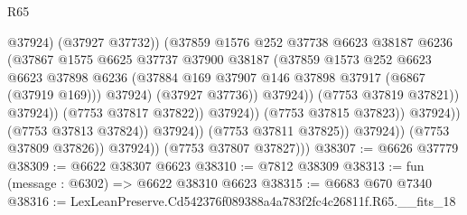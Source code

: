 \begin{lexlean}{R65}
\begin{coremodule}
{                                                  @37924)
                                                (@37927 @37732))
                                              (@37859
                                                @1576
                                                @252
                                                @37738
                                                @6623
                                                @38187
                                                @6236
                                                (@37867
                                                  @1575
                                                  @6625
                                                  @37737
                                                  @37900
                                                  @38187
                                                  (@37859
                                                    @1573
                                                    @252
                                                    @6623
                                                    @6623
                                                    @37898
                                                    @6236
                                                    (@37884
                                                      @169
                                                      @37907
                                                      @146
                                                      @37898
                                                      @37917
                                                      (@6867 (@37919 @169)))
                                                    @37924)
                                                  (@37927 @37736))
                                                @37924))
                                            (@7753 @37819 @37821))
                                          @37924))
                                      (@7753 @37817 @37822))
                                    @37924))
                                (@7753 @37815 @37823))
                              @37924))
                          (@7753 @37813 @37824))
                        @37924))
                    (@7753 @37811 @37825))
                  @37924))
              (@7753 @37809 @37826))
            @37924))
        (@7753 @37807 @37827)))
@38307 := @6626 @37779
@38309 := @6622 @38307 @6623
@38310 := @7812 @38309
@38313 := fun (message : @6302) => @6622 @38310 @6623
@38315 := @6683 @670 @7340
@38316 := LexLeanPreserve.Cd542376f089388a4a783f2fc4c26811f.R65.__fits_18
}
\end{coremodule}
\end{lexlean}
